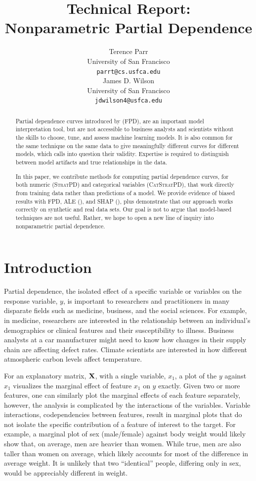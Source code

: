 \documentclass{article}
\title{Technical Report:\\
Nonparametric Partial Dependence}
\author{%
  Terence Parr \\
  University of San Francisco\\
  \texttt{parrt@cs.usfca.edu} \\
  \And
  James D. Wilson \\
  University of San Francisco\\
  \texttt{jdwilson4@usfca.edu} \\
}
\newcommand{\spd}{\fontfamily{cmr}\textsc{\small StratPD}}
\newcommand{\cspd}{\fontfamily{cmr}\textsc{\small CatStratPD}}
\begin{document}
\maketitle

\begin{abstract}
Partial dependence curves introduced by \cite{PDP} (FPD), are an important model interpretation tool, but are not accessible to business analysts and scientists without the skills to choose, tune, and assess machine learning models.  It is also common for the same technique on the same data to give meaningfully different curves for different models, which calls into question their validity.  Expertise is required to distinguish between model artifacts and true relationships in the data.

In this paper, we contribute methods for computing partial dependence curves, for both numeric (\spd) and categorical variables (\cspd), that work directly from training data rather than predictions of a model. We provide evidence of biased results with FPD, ALE (\cite{ALE}), and SHAP (\cite{shap}), plus demonstrate that our approach works correctly on synthetic and real data sets.  Our goal is not to argue that model-based techniques are not useful. Rather, we hope to open a new line of inquiry into nonparametric partial dependence.
\end{abstract}

\section{Introduction}

Partial dependence, the isolated effect of a specific variable or variables on the response variable, $y$, is important to researchers and practitioners in many disparate fields such as medicine, business, and the social sciences. For example, in medicine, researchers are interested in the relationship between an individual's demographics or clinical features and their susceptibility to illness. Business analysts at a car manufacturer might need to know how changes in their supply chain are affecting defect rates. Climate scientists are interested in how different atmospheric carbon levels affect temperature.

For an explanatory matrix, $\bf X$, with a single variable, $x_1$, a plot of the $y$ against $x_1$ visualizes the marginal effect of feature $x_1$ on $y$ exactly. Given two or more features, one can similarly plot the marginal effects of each feature separately, however, the analysis is complicated by the interactions of the variables.   Variable interactions, codependencies between features, result in marginal plots that do not isolate the specific contribution of a feature of interest to the target. For example, a marginal plot of sex (male/female) against body weight would likely show that, on average, men are heavier than women. While true, men are also taller than women on average, which likely accounts for most of the difference in average weight. It is unlikely that two ``identical'' people, differing only in sex, would be appreciably different in weight.  
\end{document}
